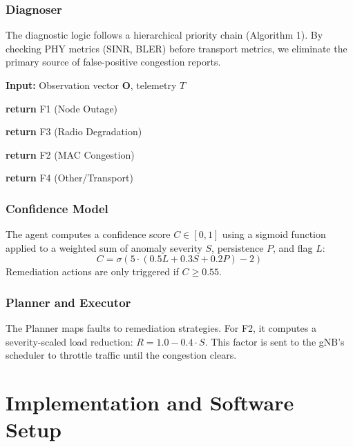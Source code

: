 \documentclass[journal]{IEEEtran}
\begin{document}
\subsubsection{Diagnoser}
The diagnostic logic follows a hierarchical priority chain (Algorithm 1). By checking PHY metrics (SINR, BLER) before transport metrics, we eliminate the primary source of false-positive congestion reports.

\begin{algorithm}
\caption{Priority-Ordered Fault Diagnosis}
\begin{algorithmic}[1]
\STATE \textbf{Input:} Observation vector $\mathbf{O}$, telemetry $T$

    \STATE \textbf{return} F1 (Node Outage)

    \STATE \textbf{return} F3 (Radio Degradation)

    \STATE \textbf{return} F2 (MAC Congestion)

\ELSE
    \STATE \textbf{return} F4 (Other/Transport)
\ENDIF

\end{algorithmic}
\end{algorithm}

\subsubsection{Confidence Model}
The agent computes a confidence score $C \in [0, 1]$ using a sigmoid function applied to a weighted sum of anomaly severity $S$, persistence $P$, and flag $L$:
\begin{equation}
    C = \sigma(5 \cdot (0.5L + 0.3S + 0.2P) - 2)
\end{equation}
Remediation actions are only triggered if $C \geq 0.55$.

\subsubsection{Planner and Executor}
The Planner maps faults to remediation strategies. For F2, it computes a severity-scaled load reduction: $R = 1.0 - 0.4 \cdot S$. This factor is sent to the gNB's scheduler to throttle traffic until the congestion clears.

\section{Implementation and Software Setup}
\end{document}

